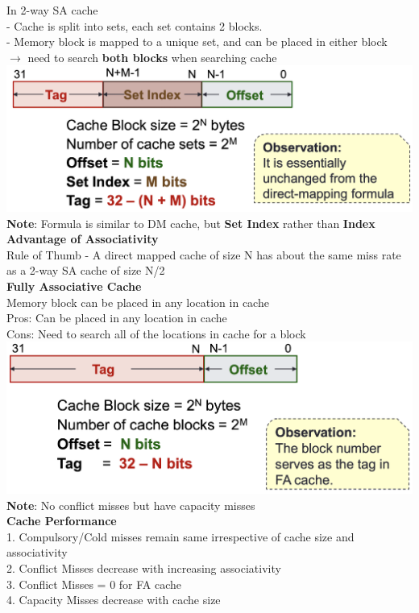 \documentclass[10pt, a4paper]{article}
\newcommand{\highlight}[1]{{\color{red}\textbf{#1}}}
\newcommand{\red}[1]{{\color{red}#1}}
\newcommand{\green}[1]{{\color{ForestGreen}#1}}
\begin{document}
\begin{multicols*}{3}
		In 2-way SA cache\\
		- Cache is split into sets, each set contains 2 blocks.\\
		- Memory block is mapped to a unique set, and can be placed in either block\\
		$\rightarrow$ need to search \highlight{both blocks} when searching cache\\
		\includegraphics[scale=.3]{./assets/SACache}
		\highlight{Note}: Formula is similar to DM cache, but \highlight{Set Index} rather than \highlight{Index}\\

		\textbf{Advantage of Associativity}\\
		Rule of Thumb - A direct mapped cache of size N has about the same miss rate as a 2-way SA cache of size N/2\\

		\textbf{Fully Associative Cache}\\
		Memory block can be placed in any location in cache\\
		\green{Pros}: Can be placed in any location in cache\\
		\red{Cons}: Need to search all of the locations in cache for a block\\
		\includegraphics[scale=.28]{./assets/FACache}\\
		\highlight{Note}: No conflict misses but have capacity misses\\

		\textbf{Cache Performance}\\
		1. Compulsory/Cold misses remain same irrespective of cache size and associativity\\
		2. Conflict Misses decrease with increasing associativity\\
		3. Conflict Misses = 0 for FA cache\\
		4. Capacity Misses decrease with cache size\\


\end{multicols*}
\end{document}
